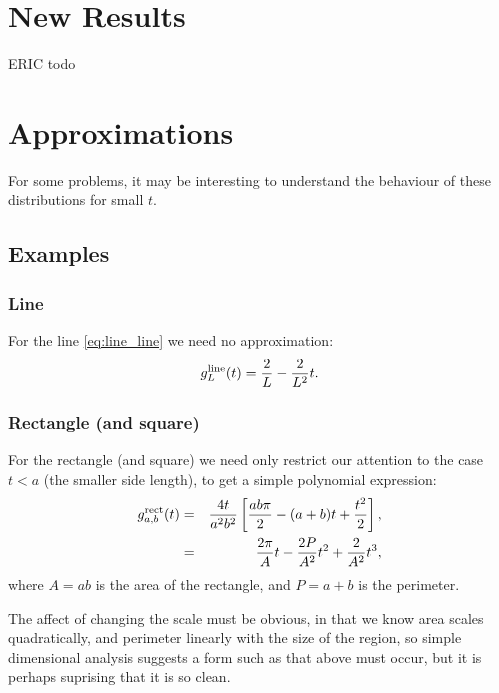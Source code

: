 \documentclass{article}
\begin{document}

\section{New Results}

ERIC todo


 
\section{Approximations}

For some problems, it may be interesting to understand the behaviour
of these distributions for small $t$. 

\subsection{Examples}

\subsubsection{Line}
For the line \eqref{eq:line_line} we need no approximation:
\begin{equation}
  g^{\rm line}_L(t) = \frac{2}{L} - \frac{2}{L^2} t.
\end{equation}

\subsubsection{Rectangle (and square)}
For the rectangle (and square) we need only restrict our attention to
the case $t<a$ (the smaller side length), to get a simple polynomial
expression: 
\begin{eqnarray}
  g^{\rm rect}_{a,b}(t) & = & 
           \frac{4 t}{a^2 b^2}  
         \left[ \frac{ab \pi}{2} - (a+b) t + \frac{t^2}{2} \right],
          \nonumber \\
                         & = & \frac{2 \pi}{A} t 
                              - \frac{2 P}{A^2} t^2
                              + \frac{2}{A^2} t^3,
\end{eqnarray}
where $A = ab$ is the area of the rectangle, and $P = a+b$ is the perimeter.

The affect of changing the scale must be obvious, in that we know area
scales quadratically, and perimeter linearly with the size of the
region, so simple dimensional analysis suggests a form such as that
above must occur, but it is perhaps suprising that it is so clean. 
\end{document}
